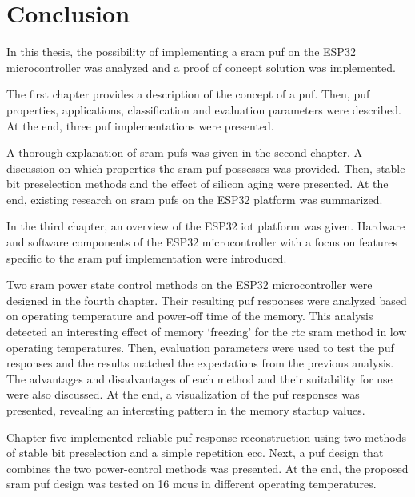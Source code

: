 \chapter*{Conclusion}\label{sec:conclusion}
{}

In this thesis, the possibility of implementing a \gls{sram} \gls{puf} on the ESP32 microcontroller was analyzed and a proof of concept solution was implemented. 

The first chapter provides a description of the concept of a \gls{puf}. Then, \gls{puf} properties, applications, classification and evaluation parameters were described. At the end, three \gls{puf} implementations were presented.

A thorough explanation of \gls{sram} \glspl{puf} was given in the second chapter. A discussion on which properties the \gls{sram} \gls{puf} possesses was provided. Then, stable bit preselection methods and the effect of silicon aging were presented. At the end, existing research on \gls{sram} \glspl{puf} on the ESP32 platform was summarized.

In the third chapter, an overview of the ESP32 \gls{iot} platform was given. Hardware and software components of the ESP32 microcontroller with a focus on features specific to the \gls{sram} \gls{puf} implementation were introduced.

Two \gls{sram} power state control methods on the ESP32 microcontroller were designed in the fourth chapter. Their resulting \gls{puf} responses were analyzed based on operating temperature and power-off time of the memory. This analysis detected an interesting effect of memory `freezing' for the \gls{rtc} \gls{sram} method in low operating temperatures. Then, evaluation parameters were used to test the \gls{puf} responses and the results matched the expectations from the previous analysis. The advantages and disadvantages of each method and their suitability for use were also discussed. At the end, a visualization of the \gls{puf} responses was presented, revealing an interesting pattern in the memory startup values.

Chapter five implemented reliable \gls{puf} response reconstruction using two methods of stable bit preselection and a simple repetition \gls{ecc}. Next, a \gls{puf} design that combines the two power-control methods was presented. At the end, the proposed \gls{sram} \gls{puf} design was tested on 16 \glspl{mcu} in different operating temperatures.

